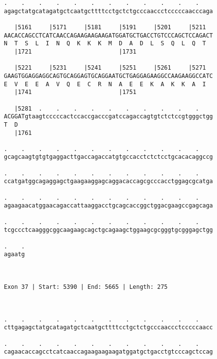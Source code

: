 \documentclass{article}
\begin{document}
\begin{Verbatim}
.    .    .    .    .    .    .    .    .    .    .    .    
agagctatgcatagatgctcaatgcttttcctgctctgcccaaccctcccccaacccaga
                                                            
   |5161     |5171     |5181     |5191     |5201     |5211  
AACACCAGCCTCATCAACCAGAAGAAGAAGATGGATGCTGACCTGTCCCAGCTCCAGACT
N  T  S  L  I  N  Q  K  K  K  M  D  A  D  L  S  Q  L  Q  T  
   |1721                         |1731                      
  
   |5221     |5231     |5241     |5251     |5261     |5271  
GAAGTGGAGGAGGCAGTGCAGGAGTGCAGGAATGCTGAGGAGAAGGCCAAGAAGGCCATC
E  V  E  E  A  V  Q  E  C  R  N  A  E  E  K  A  K  K  A  I  
   |1741                         |1751                      
  
   |5281  .    .    .    .    .    .    .    .    .    .    
ACGGATgtaagtcccccactccaccgacccgatccagaccagtgtctctccgtgggctgg
T  D                                                        
   |1761                                                    
  
.    .    .    .    .    .    .    .    .    .    .    .    
gcagcaagtgtgtgaggacttgaccagaccatgtgccacctctctcctgcacacaggccg
                                                            
.    .    .    .    .    .    .    .    .    .    .    .    
ccatgatggcagaggagctgaagaaggagcaggacaccagcgcccacctggagcgcatga
                                                            
.    .    .    .    .    .    .    .    .    .    .    .    
agaagaacatggaacagaccattaaggacctgcagcaccggctggacgaagccgagcaga
                                                            
.    .    .    .    .    .    .    .    .    .    .    .    
tcgccctcaagggcggcaagaagcagctgcagaagctggaagcgcgggtgcgggagctgg
                                                            
.    .
agaatg
      
      
 
Exon 37 | Start: 5390 | End: 5665 | Length: 275



.    .    .    .    .    .    .    .    .    .    .    .    
cttgagagctatgcatagatgctcaatgcttttcctgctctgcccaaccctcccccaacc
                                                            
.    .    .    .    .    .    .    .    .    .    .    .    
cagaacaccagcctcatcaaccagaagaagaagatggatgctgacctgtcccagctccag
                                                            

\end{Verbatim}
\end{document}
